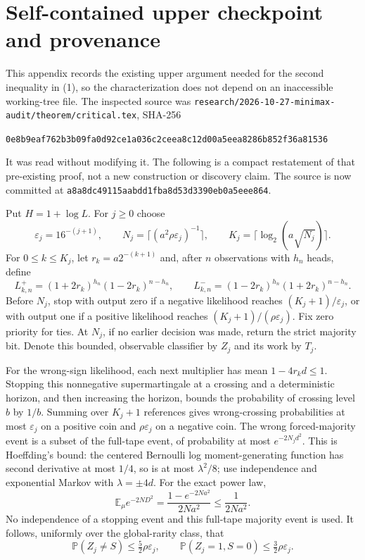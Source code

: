 \documentclass[11pt]{article}
\newcommand{\E}{\mathbb E}
\newcommand{\Pp}{\mathbb P}
\begin{document}
\appendix
\section{Self-contained upper checkpoint and provenance}
This appendix records the existing upper argument needed for the second
inequality in (1), so the characterization does not depend on an inaccessible
working-tree file. The inspected source was
\texttt{research/2026-10-27-minimax-audit/theorem/critical.tex}, SHA-256
\begin{center}\small\texttt{0e8b9eaf762b3b09fa0d92ce1a036c2ceea8c12d00a5eea8286b852f36a81536}\end{center}
It was read without modifying it. The following is a compact restatement of
that pre-existing proof, not a new construction or discovery claim.
The source is now committed at
\texttt{a8a8dc49115aabdd1fba8d53d3390eb0a5eee864}.

Put $H=1+\log L$. For $j\ge0$ choose
\[
 \varepsilon_j=16^{-(j+1)},\qquad
 N_j=\lceil(a^2\rho\varepsilon_j)^{-1}\rceil,\qquad
 K_j=\lceil\log_2(a\sqrt{N_j})\rceil.
\]
For $0\le k\le K_j$, let $r_k=a2^{-(k+1)}$ and, after $n$ observations
with $h_n$ heads, define
\[
 L^+_{k,n}=(1+2r_k)^{h_n}(1-2r_k)^{n-h_n},\qquad
 L^-_{k,n}=(1-2r_k)^{h_n}(1+2r_k)^{n-h_n}.
\]
Before $N_j$, stop with output zero if a negative likelihood reaches
$(K_j+1)/\varepsilon_j$, or with output one if a positive likelihood reaches
$(K_j+1)/(\rho\varepsilon_j)$. Fix zero priority for ties. At $N_j$, if no
earlier decision was made, return the strict majority bit. Denote this bounded,
observable classifier by $Z_j$ and its work by $T_j$.

For the wrong-sign likelihood, each next multiplier has mean $1-4r_kd\le1$.
Stopping this nonnegative supermartingale at a crossing and a deterministic
horizon, and then increasing the horizon, bounds the probability of crossing
level $b$ by $1/b$. Summing over $K_j+1$ references gives wrong-crossing
probabilities at most $\varepsilon_j$ on a positive coin and
$\rho\varepsilon_j$ on a negative coin. The wrong forced-majority event is
a subset of the full-tape event, of probability at most $e^{-2N_jd^2}$.
This is Hoeffding's bound: the centered Bernoulli log moment-generating
function has second derivative at most $1/4$, so is at most $\lambda^2/8$;
use independence and exponential Markov with $\lambda=\pm4d$.
For the exact power law,
\[
 \E_\mu e^{-2ND^2}=\frac{1-e^{-2Na^2}}{2Na^2}\le\frac1{2Na^2}.
\]
No independence of a stopping event and this full-tape majority event is used.
It follows, uniformly over the global-rarity class, that
\[
 \Pp(Z_j\ne S)\le\tfrac52\rho\varepsilon_j,
 \qquad \Pp(Z_j=1,S=0)\le\tfrac32\rho\varepsilon_j.       \tag{11}
\]
\end{document}
